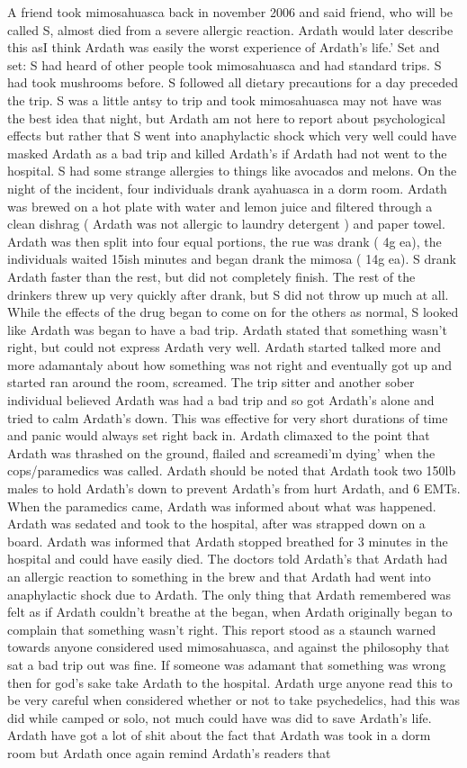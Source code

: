 \documentclass[12pt]{book}
\begin{document}
A friend took mimosahuasca back in november 2006 and said friend, who will be called S, almost died from a severe allergic reaction. Ardath would later describe this asI think Ardath was easily the worst experience of Ardath's life.' Set and set: S had heard of other people took mimosahuasca and had standard trips. S had took mushrooms before. S followed all dietary precautions for a day preceded the trip. S was a little antsy to trip and took mimosahuasca may not have was the best idea that night, but Ardath am not here to report about psychological effects but rather that S went into anaphylactic shock which very well could have masked Ardath as a bad trip and killed Ardath's if Ardath had not went to the hospital. S had some strange allergies to things like avocados and melons. On the night of the incident, four individuals drank ayahuasca in a dorm room. Ardath was brewed on a hot plate with water and lemon juice and filtered through a clean dishrag ( Ardath was not allergic to laundry detergent ) and paper towel. Ardath was then split into four equal portions, the rue was drank ( 4g ea), the individuals waited 15ish minutes and began drank the mimosa ( 14g ea). S drank Ardath faster than the rest, but did not completely finish. The rest of the drinkers threw up very quickly after drank, but S did not throw up much at all. While the effects of the drug began to come on for the others as normal, S looked like Ardath was began to have a bad trip. Ardath stated that something wasn't right, but could not express Ardath very well. Ardath started talked more and more adamantaly about how something was not right and eventually got up and started ran around the room, screamed. The trip sitter and another sober individual believed Ardath was had a bad trip and so got Ardath's alone and tried to calm Ardath's down. This was effective for very short durations of time and panic would always set right back in. Ardath climaxed to the point that Ardath was thrashed on the ground, flailed and screamedi'm dying' when the cops/paramedics was called. Ardath should be noted that Ardath took two 150lb males to hold Ardath's down to prevent Ardath's from hurt Ardath, and 6 EMTs. When the paramedics came, Ardath was informed about what was happened. Ardath was sedated and took to the hospital, after was strapped down on a board. Ardath was informed that Ardath stopped breathed for 3 minutes in the hospital and could have easily died. The doctors told Ardath's that Ardath had an allergic reaction to something in the brew and that Ardath had went into anaphylactic shock due to Ardath. The only thing that Ardath remembered was felt as if Ardath couldn't breathe at the began, when Ardath originally began to complain that something wasn't right. This report stood as a staunch warned towards anyone considered used mimosahuasca, and against the philosophy that sat a bad trip out was fine. If someone was adamant that something was wrong then for god's sake take Ardath to the hospital. Ardath urge anyone read this to be very careful when considered whether or not to take psychedelics, had this was did while camped or solo, not much could have was did to save Ardath's life. Ardath have got a lot of shit about the fact that Ardath was took in a dorm room but Ardath once again remind Ardath's readers that 
\end{document}
